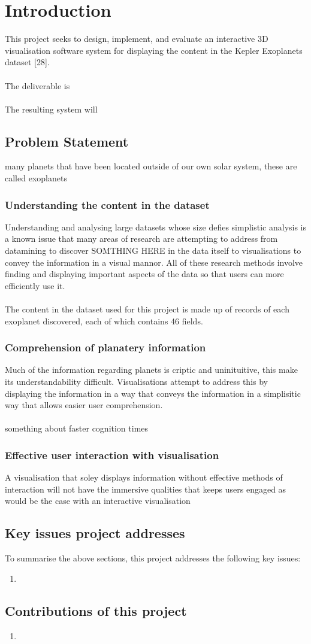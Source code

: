 \chapter{Introduction}\label{C:intro}
This project seeks to design, implement, and evaluate an interactive 3D visualisation
software system for displaying the content in the Kepler Exoplanets dataset [28]. 
\\\\
The deliverable is 
\\\\
The resulting system will

\section{Problem Statement}
many planets that have been located outside of our own solar system, these are
called exoplanets
\subsection{Understanding the content in the dataset}
Understanding and analysing large datasets whose size defies simplistic analysis is a known issue that many areas of research are attempting to address from datamining to discover SOMTHING HERE in the data itself to visualisations to convey the information in a visual mannor. All of these research methods involve finding and displaying important aspects of the data so that users can more efficiently use it.
\\\\
The content in the dataset used for this project is made up of records of each exoplanet discovered, each of which contains 46 fields.

\subsection{Comprehension of planatery information}
Much of the information regarding planets is criptic and uninituitive, this make its understandability difficult. Visualisations attempt to address this by displaying the information in a way that conveys the information in a simplisitic way that allows easier user comprehension.
\\\\
something about faster cognition times
\subsection{Effective user interaction with visualisation}
A visualisation that soley displays information without effective methods of interaction will not have the immersive qualities that keeps users engaged as would be the case with an interactive visualisation
\section{Key issues project addresses}
To summarise the above sections, this project addresses the following key issues:
\begin{enumerate}
 \item 
\end{enumerate}

\section{Contributions of this project}
\begin{enumerate}
 \item 
\end{enumerate}
